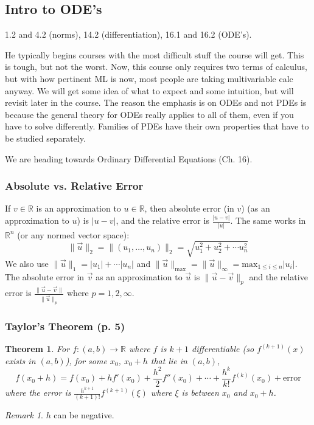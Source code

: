 \documentclass{article}
\theoremstyle{plain}
\newtheorem{theorem}{Theorem}
\theoremstyle{remark}
\newtheorem{remark}{Remark}
\newcommand{\R}{{\mathbb R}}
\begin{document}
\subsection{Intro to ODE's}
1.2 and 4.2 (norms), 14.2 (differentiation), 16.1 and 16.2 (ODE's).

He typically begins courses with the most difficult stuff the course will get.
This is tough, but not the worst.
Now, this course only requires two terms of calculus,
but with how pertinent ML is now, most people are taking multivariable calc anyway.
We will get some idea of what to expect and some intuition, but will revisit later in the course.
The reason the emphasis is on ODEs and not PDEs is because
the general theory for ODEs really applies to all of them,
even if you have to solve differently.
Families of PDEs have their own properties that have to be studied separately.

We are heading towards Ordinary Differential Equations (Ch. 16).

\subsubsection{Absolute vs. Relative Error}
If $v \in \R$ is an approximation to $u \in \R$,
then absolute error (in $v$) (as an approximation to $u$) is $\lvert u - v \rvert$,
and the relative error is $\frac{\lvert u - v\rvert}{\lvert u \rvert}$.
The same works in $\R^n$ (or any normed vector space):
\[
	\lVert \vec{u} \rVert_2 = \lVert (u_1, \dots, u_n) \rVert_2
	= \sqrt{u_1^2 + u_2^2 + \cdots u_n^2}
\]
We also use $\lVert \vec{u} \rVert_1 = |u_1|+ \cdots |u_n|$
and $\lVert \vec{u}\rVert_{\mathrm{max}} = \lVert \vec{u} \rVert_\infty
= \mathrm{max}_{1 \leq i \leq n} |u_i|$.
The absolute error in $\vec{v}$ as an approximation to
$\vec{u}$ is $\lVert \vec{u} - \vec{v}\rVert_p$
and the relative error is $\frac{\lVert \vec{u} - \vec{v} \rVert}{\lVert \vec{u} \rVert_p}$
where $p = 1,2,\infty$.

\subsubsection{Taylor's Theorem (p. 5)}
\begin{theorem}
	For $f \colon (a,b) \to \R$ where $f$ is $k+1$ differentiable
	(so $f^{(k+1)}(x)$ exists in $(a,b)$),
	for some $x_0$, $x_0 + h$ that lie in $(a,b)$,
	\[
		f(x_0 + h) = f(x_0) + hf'(x_0) + \frac{h^2}{2}f''(x_0) + \cdots
		+ \frac{h^k}{k!}f^{(k)}(x_0) + \mathrm{error}
	\]
	where the error is $\frac{h^{k+1}}{(k+1)!}f^{(k+1)}(\xi)$
	where $\xi$ is between $x_0$ and $x_0 + h$.
\end{theorem}
\begin{remark}
	$h$ can be negative.
\end{remark}
\end{document}
